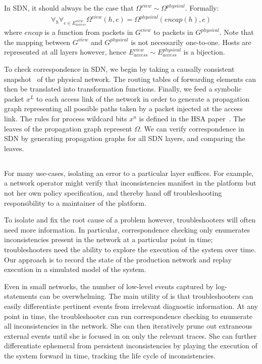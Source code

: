 In SDN, it should always be the case that 
$\Omega^{view} \sim \Omega^{physical}$. 
Formally:
\begin{align*}
\forall_{h} \forall_{e \in E_{access}^{view}} \Omega^{view}(h,e) =
\Omega^{physical}(encap(h),e) 
\end{align*}
where $encap$ is a function from packets in $G^{view}$ to packets in
$G^{physical}$. Note that the mapping between $G^{view}$ and $G^{physical}$ is not
necessarily one-to-one. Hosts are represented at all layers however, hence
$E_{access}^{view} \sim E_{access}^{physical}$ is a bijection.

To check correspondence in SDN, we begin by taking a causally consistent
snapshot~\cite{Chandy:1985:DSD:214451.214456} of the physical network. The routing
tables of forwarding elements can then be translated into transformation functions.
Finally, we feed a symbolic packet $x^L$ to each access link of the network in
order to generate
a propagation graph representing all possible paths taken by a packet injected
at the access link. The rules for process wildcard bits $x^n$ is defined in
the HSA paper~\cite{hsa}. The leaves of the propagation graph represent $\Omega$. We
can verify correspondence in SDN by generating propagation graphs for all SDN layers,
and comparing the leaves.

\subsection{\SIMULATOR{}}

For many use-cases, isolating an error to a particular layer suffices.
For example, a network operator might verify that inconsistencies manifest in
the platform but not her own policy specification, and thereby hand off
troubleshooting responsibility to a maintainer of the platform. 

To isolate and fix the root cause of a problem however, troubleshooters will often
need more information. In particular, correspondence checking only enumerates
inconsistencies present in the network at a particular point in time;
troubleshooters need the ability to explore the execution of the system over
time. Our approach is to record the state of the production network and replay 
execution in a simulated model of the system.

Even in small networks,
the number of low-level events captured by
log-statements can be overwhelming. The main utility of \simulator is that
troubleshooters can easily differentiate pertinent events from
irrelevant diagnostic information. At any point in time, the troubleshooter
can run correspondence checking to enumerate all inconsistencies in the
network. She can then iteratively prune out extraneous external events until
she is focused in on only the relevant traces. She can further differentiate
ephemeral from persistent inconsistencies by playing the execution of the
system forward in time, tracking the life cycle of inconsistencies.

